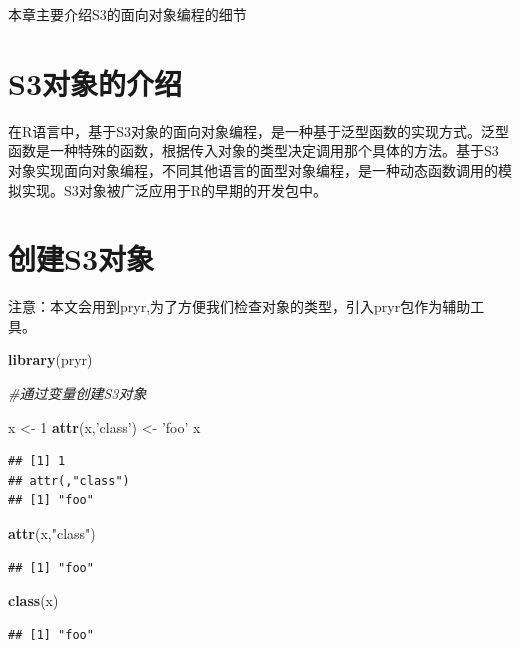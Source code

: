 \documentclass[]{book}
\newenvironment{Shaded}{\begin{snugshade}}{\end{snugshade}}
\newcommand{\KeywordTok}[1]{\textcolor[rgb]{0.13,0.29,0.53}{\textbf{#1}}}
\newcommand{\DecValTok}[1]{\textcolor[rgb]{0.00,0.00,0.81}{#1}}
\newcommand{\StringTok}[1]{\textcolor[rgb]{0.31,0.60,0.02}{#1}}
\newcommand{\CommentTok}[1]{\textcolor[rgb]{0.56,0.35,0.01}{\textit{#1}}}
\newcommand{\NormalTok}[1]{#1}
\begin{document}
本章主要介绍S3的面向对象编程的细节

\section{S3对象的介绍}\label{s3}

在R语言中，基于S3对象的面向对象编程，是一种基于泛型函数的实现方式。泛型函数是一种特殊的函数，根据传入对象的类型决定调用那个具体的方法。基于S3对象实现面向对象编程，不同其他语言的面型对象编程，是一种动态函数调用的模拟实现。S3对象被广泛应用于R的早期的开发包中。

\section{创建S3对象}\label{s3}

注意：本文会用到pryr,为了方便我们检查对象的类型，引入pryr包作为辅助工具。

\begin{Shaded}
\begin{Highlighting}[]
\KeywordTok{library}\NormalTok{(pryr)}

\CommentTok{#通过变量创建S3对象}

\NormalTok{x <-}\StringTok{ }\DecValTok{1}
\KeywordTok{attr}\NormalTok{(x,}\StringTok{'class'}\NormalTok{) <-}\StringTok{ 'foo'}
\NormalTok{x}
\end{Highlighting}
\end{Shaded}

\begin{verbatim}
## [1] 1
## attr(,"class")
## [1] "foo"
\end{verbatim}

\begin{Shaded}
\begin{Highlighting}[]
\KeywordTok{attr}\NormalTok{(x,}\StringTok{"class"}\NormalTok{)}
\end{Highlighting}
\end{Shaded}

\begin{verbatim}
## [1] "foo"
\end{verbatim}

\begin{Shaded}
\begin{Highlighting}[]
\KeywordTok{class}\NormalTok{(x)}
\end{Highlighting}
\end{Shaded}

\begin{verbatim}
## [1] "foo"
\end{verbatim}
\end{document}

